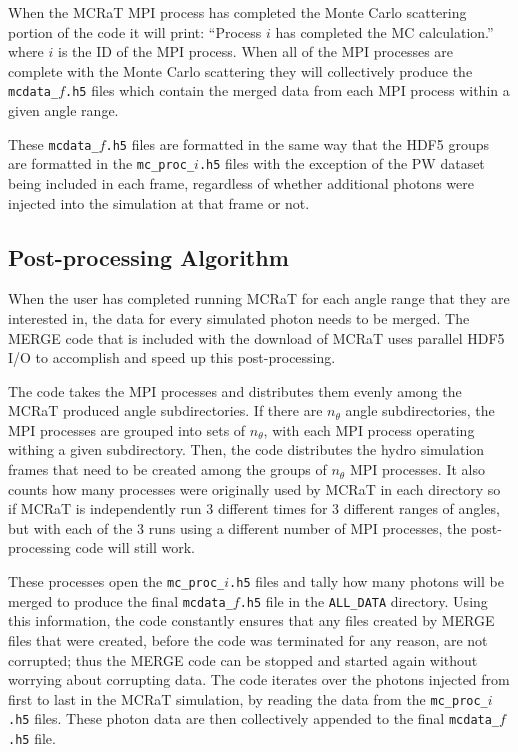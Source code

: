 \documentclass[12pt,a4paper]{article}
\begin{document}
When the MCRaT MPI process has completed the Monte Carlo scattering portion of the code it will print: ``Process $i$ has completed the MC calculation.'' where $i$ is the ID of the MPI process. When all of the MPI processes are complete with the Monte Carlo scattering they will collectively produce the \texttt{mcdata\_$f$.h5} files which contain the merged data from each MPI process within a given angle range.

These \texttt{mcdata\_$f$.h5} files are formatted in the same way that the HDF5 groups are formatted in the \texttt{mc\_proc\_$i$.h5} files with the exception of the PW dataset being included in each frame, regardless of whether additional photons were injected into the simulation at that frame or not. 

\subsection{Post-processing Algorithm}
When the user has completed running MCRaT for each angle range that they are interested in, the data for every simulated photon needs to be merged. The MERGE code that is included with the download of MCRaT uses parallel HDF5 I/O to accomplish and speed up this post-processing. 

The code takes the MPI processes and distributes them evenly among the MCRaT produced angle subdirectories. If there are $n_\theta$ angle subdirectories, the MPI processes are grouped into sets of $n_\theta$, with each MPI process operating withing a given subdirectory. Then, the code distributes the hydro simulation frames that need to be created among the groups of $n_\theta$ MPI processes. It also counts how many processes were originally used by MCRaT in each directory so if MCRaT is independently run 3 different times for 3 different ranges of angles, but with each of the 3 runs using a different number of MPI processes, the post-processing code will still work.

These processes open the \texttt{mc\_proc\_$i$.h5} files and tally how many photons will be merged to produce the final \texttt{mcdata\_$f$.h5} file in the \texttt{ALL\_DATA} directory. Using this information, the code constantly ensures that any files created by MERGE files that were created, before the code was terminated for any reason, are not corrupted; thus the MERGE code can be stopped and started again without worrying about corrupting data. The code iterates over the photons injected from first to last in the MCRaT simulation, by reading the data from the \texttt{mc\_proc\_$i$.h5} files. These photon data are then collectively appended to the final \texttt{mcdata\_$f$.h5} file. 
\end{document}
